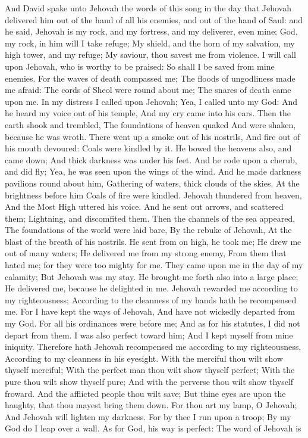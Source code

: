 And David spake unto Jehovah the words of this song in the day that Jehovah delivered him out of the hand of all his enemies, and out of the hand of Saul: and he said, Jehovah is my rock, and my fortress, and my deliverer, even mine;  God, my rock, in him will I take refuge; My shield, and the horn of my salvation, my high tower, and my refuge; My saviour, thou savest me from violence.  I will call upon Jehovah, who is worthy to be praised: So shall I be saved from mine enemies.  For the waves of death compassed me; The floods of ungodliness made me afraid:  The cords of Sheol were round about me; The snares of death came upon me.  In my distress I called upon Jehovah; Yea, I called unto my God: And he heard my voice out of his temple, And my cry came into his ears.  Then the earth shook and trembled, The foundations of heaven quaked And were shaken, because he was wroth.  There went up a smoke out of his nostrils, And fire out of his mouth devoured: Coals were kindled by it.  He bowed the heavens also, and came down; And thick darkness was under his feet.  And he rode upon a cherub, and did fly; Yea, he was seen upon the wings of the wind.  And he made darkness pavilions round about him, Gathering of waters, thick clouds of the skies.  At the brightness before him Coals of fire were kindled.  Jehovah thundered from heaven, And the Most High uttered his voice.  And he sent out arrows, and scattered them; Lightning, and discomfited them.  Then the channels of the sea appeared, The foundations of the world were laid bare, By the rebuke of Jehovah, At the blast of the breath of his nostrils.  He sent from on high, he took me; He drew me out of many waters;  He delivered me from my strong enemy, From them that hated me; for they were too mighty for me.  They came upon me in the day of my calamity; But Jehovah was my stay.  He brought me forth also into a large place; He delivered me, because he delighted in me.  Jehovah rewarded me according to my righteousness; According to the cleanness of my hands hath he recompensed me.  For I have kept the ways of Jehovah, And have not wickedly departed from my God.  For all his ordinances were before me; And as for his statutes, I did not depart from them.  I was also perfect toward him; And I kept myself from mine iniquity.  Therefore hath Jehovah recompensed me according to my righteousness, According to my cleanness in his eyesight.  With the merciful thou wilt show thyself merciful; With the perfect man thou wilt show thyself perfect;  With the pure thou wilt show thyself pure; And with the perverse thou wilt show thyself froward.  And the afflicted people thou wilt save; But thine eyes are upon the haughty, that thou mayest bring them down.  For thou art my lamp, O Jehovah; And Jehovah will lighten my darkness.  For by thee I run upon a troop; By my God do I leap over a wall.  As for God, his way is perfect: The word of Jehovah is 